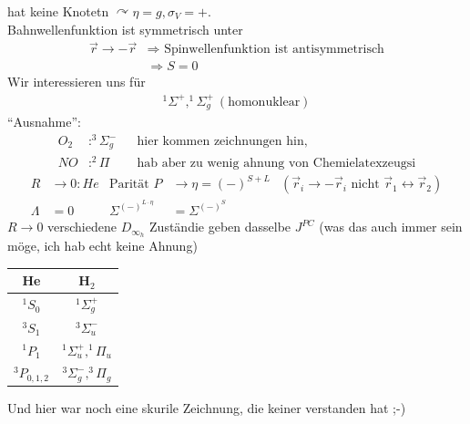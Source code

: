 hat keine Knotetn $\curvearrowright \eta = g, \sigma_V = +$.
\\
Bahnwellenfunktion ist symmetrisch unter
	\begin{align*}
		\vec{r} \rightarrow - \vec{r} &\Rightarrow \text{ Spinwellenfunktion ist antisymmetrisch}\\
		&\Rightarrow S = 0
	\end{align*}
Wir interessieren uns für 	
	\begin{align*}
		^1\Sigma^+, ^1\Sigma^+_g ~(\text{homonuklear})
	\end{align*}
``Ausnahme'':
	\begin{align*}
		O_2 &: ^3\Sigma^-_g & &\text{hier kommen zeichnungen hin, }\\
		NO &: ^2\Pi & &\text{hab aber zu wenig ahnung von Chemielatexzeugsi}
	\end{align*}
	\begin{align*}
		R &\rightarrow 0 : He &\text{Parität } P &\rightarrow \eta = (-)^{S + L}
		&(\vec{r}_i \rightarrow -\vec{r}_i \text{ nicht } \vec{r}_1 \leftrightarrow \vec{r}_2) \\
		\Lambda &= 0 &\Sigma^{(-)^{L \cdot \eta}} &= \Sigma^{(-)^S}
	\end{align*}
$R \rightarrow 0$ verschiedene $D_{\infty_h}$ Zuständie geben dasselbe $J^{PC}$ (was das auch immer sein möge, ich hab echt keine Ahnung)

	\begin{center}
	\begin{tabular}{c | c}
		He & H$_2$ \\ \hline 
		$^1S_0$ & $^1\Sigma^+_g$ \\
		$^3S_1$ & $^3\Sigma^-_u$ \\
		$^1P_1$ & $^1\Sigma^+_u, ^1\Pi_u$\\
		$^3P_{0,1,2}$ & $^3\Sigma^-_g, ^3\Pi_g$\\
	\end{tabular}
	\end{center}
Und hier war noch eine skurile Zeichnung, die keiner verstanden hat ;-)\\

